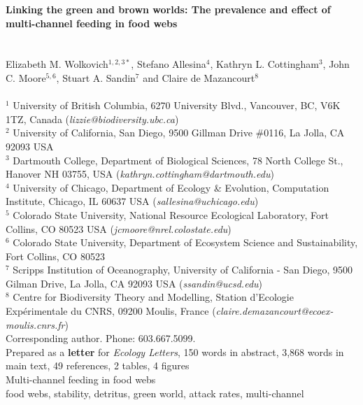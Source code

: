 \documentclass[12pt,a4paper,oneside]{article}
\begin{document}
{ \noindent \bf Linking the green and brown worlds: The prevalence and
 effect of multi-channel feeding in food webs}\\
\\
 \\
\noindent Elizabeth M. Wolkovich\(^{1,2,3*}\), Stefano Allesina\(^{4}\), Kathryn
L. Cottingham\(^{3}\), John C. Moore\(^{5,6}\), Stuart A. Sandin\(^{7}\) and Claire de
Mazancourt\(^{8}\)\\
\\
\noindent \(^{1}\) University of British Columbia, 6270 University Blvd., Vancouver, BC, V6K 1TZ, Canada (\emph{lizzie@biodiversity.ubc.ca})\\
\noindent \(^{2}\) University of California, San Diego, 9500 Gillman
Drive \#0116, La Jolla, CA 92093 USA\\
\noindent \(^{3}\) Dartmouth College, Department of Biological
Sciences, 78 North College St., Hanover NH 03755,
USA (\emph{kathryn.cottingham@dartmouth.edu})\\
\noindent \(^{4}\) University of Chicago, Department of Ecology \&
Evolution, Computation Institute, Chicago, IL 60637 USA (\emph{sallesina@uchicago.edu})\\ 
\noindent \(^{5}\) Colorado State University, National Resource Ecological Laboratory, Fort
Collins, CO 80523 USA \newline
(\emph{jcmoore@nrel.colostate.edu})\\ 
\noindent \(^{6}\) Colorado State University, Department of Ecosystem Science and Sustainability, Fort Collins, CO 80523\\
\noindent \(^{7}\) Scripps Institution of Oceanography, University of
California - San Diego, 9500 Gilman Drive, La Jolla, CA 92093 USA
(\emph{ssandin@ucsd.edu}) \\
\noindent \(^{8}\) Centre for Biodiversity Theory and Modelling, Station d'Ecologie Exp\'{e}rimentale du CNRS, 09200 Moulis, France 
(\emph{claire.demazancourt@ecoex-moulis.cnrs.fr})\\
\noindent * Corresponding author. Phone: 603.667.5099.
\\

\noindent Prepared as a {\bf letter} for \emph{Ecology Letters}, 150 words in abstract, 3,868 words in main text, 49 references, 2 tables, 4 figures\\

 Multi-channel feeding in food webs\\ 
 food webs, stability, detritus, green world, attack
rates, multi-channel\\
\end{document}
